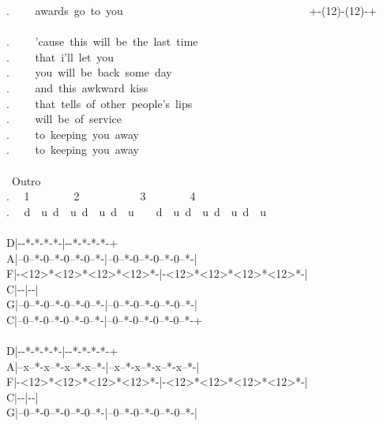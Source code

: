 {. \ \ \ \ awards\ go\ to\ you \ \ \ \ \ \ \ \ \ \ \ \ \ \ \ \ \ \ \ \ \ \ \ \ \ \ \ \ \ \ \ \ \ +-(12)-(12)-+\\
\\
. \ \ \ \ 'cause\ this\ will\ be\ the\ last\ time\\
. \ \ \ \ that\ i'll\ let\ you\\
. \ \ \ \ you\ will\ be\ back\ some\ day\\
. \ \ \ \ and\ this\ awkward\ kiss\\
. \ \ \ \ that\ tells\ of\ other\ people's\ lips\\
. \ \ \ \ will\ be\ of\ service\\
. \ \ \ \ to\ keeping\ you\ away\\
. \ \ \ \ to\ keeping\ you\ away\\\
\\
\lbrack\ Outro\rbrack\\
. \ \ 1\ \ \ \ \ \ \ \ 2\ \ \ \ \ \ \ \ \ \ \ 3\ \ \ \ \ \ \ \ 4\ \ \ \ \\
. \ ~d~~u~d~~u~d~~u~d~~u~~~~d~~u~d~~u~d~~u~d~~u~\\
\\
D|-\rbrack-*\rbrack-*\rbrack-*\rbrack-*-|-\rbrack-*\rbrack-*\rbrack-*\rbrack-*-+\\
A|--0--*-0--*-0--*-0--*-|--0--*-0--*-0--*-0--*-|\\
F|-<12>*<12>*<12>*<12>*-|-<12>*<12>*<12>*<12>*-|\\
C|-\rbrack*\lbrack 12\rbrack*{}\rbrack*{}\rbrack*-|-\rbrack*{}\rbrack*{}\rbrack*\lbrack 12\rbrack*-|\\
G|--0--*-0--*-0--*-0--*-|--0--*-0--*-0--*-0--*-|\\
C|--0--*-0--*-0--*-0--*-|--0--*-0--*-0--*-0--*-+\\
\\
D|-\rbrack-*\rbrack-*\rbrack-*\rbrack-*-|-\rbrack-*\rbrack-*\rbrack-*\rbrack-*-+\\
A|--x--*-x--*-x--*-x--*-|--x--*-x--*-x--*-x--*-|\\
F|-<12>*<12>*<12>*<12>*-|-<12>*<12>*<12>*<12>*-|\\
C|-\rbrack*\lbrack 11\rbrack*{}\rbrack*{}\rbrack*-|-\rbrack*{}\rbrack*{}\rbrack*\lbrack 11\rbrack*-|\\
G|--0--*-0--*-0--*-0--*-|--0--*-0--*-0--*-0--*-|\\
}
